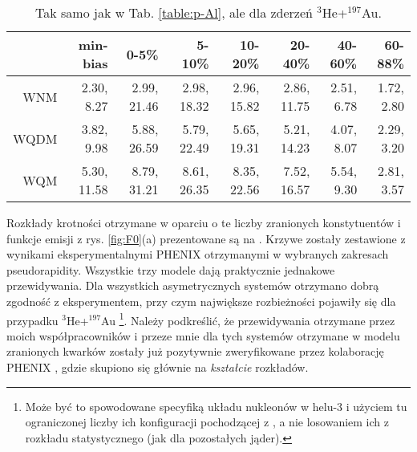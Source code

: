 \documentclass[a4paper,12pt]{article}
\begin{document}
\begin{table}[H]\centering
\begin{tabular}{|r|r|r|r|r|r|r|r|} \hline
 & min-bias & 0-5\% & 5-10\% & 10-20\% & 20-40\% & 40-60\% & 60-88\% \\ \hline
WNM  & 2.30, 8.27 & 2.99, 21.46 & 2.98, 18.32 & 2.96, 15.82 & 2.86, 11.75 & 2.51, 6.78 & 1.72, 2.80 \\ \hline
WQDM & 3.82, 9.98 & 5.88, 26.59 & 5.79, 22.49 & 5.65, 19.31 & 5.21, 14.23 & 4.07, 8.07 & 2.29, 3.20 \\ \hline
WQM  & 5.30, 11.58 & 8.79, 31.21 & 8.61, 26.35 & 8.35, 22.56 & 7.52, 16.57 & 5.54, 9.30 & 2.81, 3.57 \\ \hline
\end{tabular}
\caption{Tak samo jak w Tab. \ref{table:p-Al}, ale dla zderzeń $^3$He+$^{197}$Au.}\label{table:he-Au}
\end{table}

Rozkłady krotności otrzymane w oparciu o te liczby zranionych konstytuentów i funkcje emisji z rys. \ref{fig:F0}(a) prezentowane są na . Krzywe zostały zestawione z wynikami eksperymentalnymi PHENIX otrzymanymi w wybranych zakresach pseudorapidity. Wszystkie trzy modele dają praktycznie jednakowe przewidywania. Dla wszystkich asymetrycznych systemów otrzymano dobrą zgodność z eksperymentem, przy czym największe rozbieżności pojawiły się dla przypadku $^3$He+$^{197}$Au \footnote{Może być to spowodowane specyfiką układu nukleonów w helu-3 i użyciem tu ograniczonej liczby ich konfiguracji pochodzącej z \cite{Carlson:1997qn}, a nie losowaniem ich z rozkładu statystycznego (jak dla pozostałych jąder).}. Należy podkreślić, że przewidywania otrzymane przez moich współpracowników i przeze mnie dla tych systemów otrzymane w modelu zranionych kwarków zostały już pozytywnie zweryfikowane przez kolaborację PHENIX \cite{Adare:2018toe}, gdzie skupiono się głównie na \textit{kształcie} rozkładów.
\end{document}
